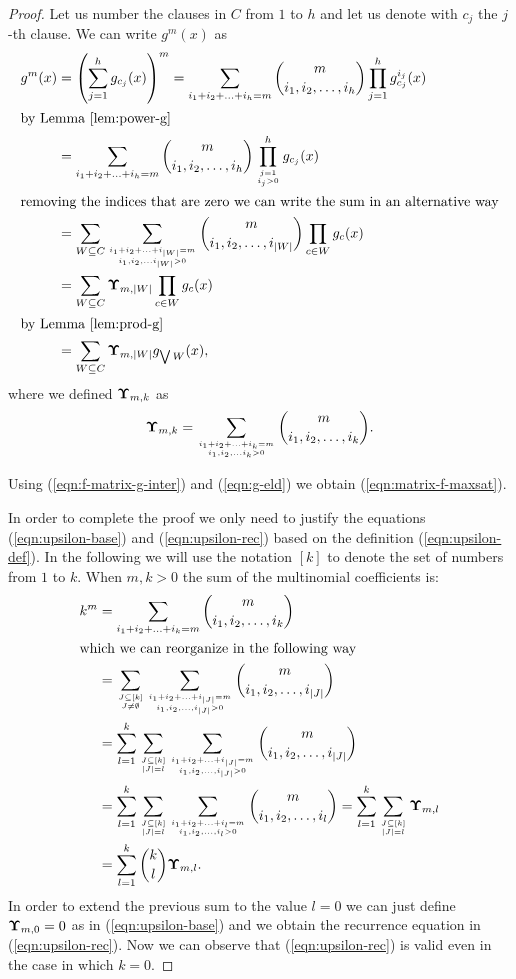 \documentclass{article}
\def\vec#1{\mathchoice{\mbox{\boldmath$\displaystyle#1$}}
  {\mbox{\boldmath$\textstyle#1$}}
  {\mbox{\boldmath$\scriptstyle#1$}}
  {\mbox{\boldmath$\scriptscriptstyle#1$}}}
\newcommand{\comb}[2]{\binom{#1}{#2}}
\begin{document}
\begin{proof}
Let us number the clauses in $C$ from $1$ to $h$ and let us denote with $c_j$ the $j$-th clause. We can write $g^m(x)$ as
\begin{align}
g^m(x) &= \left( \sum_{j=1}^{h} g_{c_j}(x)\right)^m = \sum_{i_1+i_2+\ldots+i_h=m} \comb{m}{i_1, i_2, \ldots, i_h} \prod_{j=1}^{h} g_{c_j}^{i_j}(x) \nonumber \\
\intertext{by Lemma~\ref{lem:power-g}}
&= \sum_{i_1+i_2+\ldots+i_h=m} \comb{m}{i_1, i_2, \ldots, i_h} \prod_{j=1 \atop i_j>0}^{h} g_{c_j}(x) \nonumber \\
\intertext{removing the indices that are zero we can write the sum in an alternative way}
&= \sum_{W \subseteq C} \sum_{i_1+i_2+\ldots+i_{|W|}=m \atop i_1,i_2,\ldots i_{|W|} > 0} \comb{m}{i_1,i_2,\ldots,i_{|W|}} \prod_{c \in W} g_{c}(x) \nonumber \\
&=  \sum_{W \subseteq C} \vec{\Upsilon}_{m,|W|} \prod_{c \in W} g_{c}(x) \nonumber \\
\intertext{by Lemma~\ref{lem:prod-g}}
\label{eqn:f-matrix-g-inter}
&=  \sum_{W \subseteq C} \vec{\Upsilon}_{m,|W|} g_{\bigvee W}(x),
\end{align}
where we defined $\vec{\Upsilon}_{m,k}$ as 
\begin{equation}
\label{eqn:upsilon-def}
\vec{\Upsilon}_{m,k} = \sum_{i_1+i_2+\ldots+i_{k}=m \atop i_1,i_2,\ldots i_{k} > 0} \comb{m}{i_1,i_2,\ldots,i_{k}}.
\end{equation}

Using (\ref{eqn:f-matrix-g-inter}) and (\ref{eqn:g-eld}) we obtain (\ref{eqn:matrix-f-maxsat}).

In order to complete the proof we only need to justify the equations (\ref{eqn:upsilon-base}) and (\ref{eqn:upsilon-rec}) based on the definition (\ref{eqn:upsilon-def}). 
In the following we will use the notation $[k]$ to denote the set of numbers from $1$ to $k$.
When $m,k>0$ the sum of the multinomial coefficients is:
\begin{align}
k^m &= \sum_{i_1+i_2+\ldots+i_k=m} \comb{m}{i_1,i_2,\ldots,i_k} \nonumber \\
\intertext{which we can reorganize in the following way}
&= \sum_{J \subseteq [k] \atop J \neq \emptyset} \sum_{i_1+i_2+\ldots+i_{|J|}=m \atop i_1,i_2,\ldots,i_{|J|}>0} \comb{m}{i_1,i_2,\ldots,i_{|J|}} \nonumber \\
&= \sum_{l=1}^{k} \sum_{J \subseteq [k]\atop |J|=l} \sum_{i_1+i_2+\ldots+i_{|J|}=m \atop i_1,i_2,\ldots,i_{|J|}>0} \comb{m}{i_1,i_2,\ldots,i_{|J|}} \nonumber \\
&= \sum_{l=1}^{k} \sum_{J \subseteq [k]\atop |J|=l} \sum_{i_1+i_2+\ldots+i_l=m \atop i_1,i_2,\ldots,i_l>0} \comb{m}{i_1,i_2,\ldots,i_l}
= \sum_{l=1}^{k} \sum_{J \subseteq [k]\atop |J|=l} \vec{\Upsilon}_{m,l} \nonumber \\
&= \sum_{l=1}^{k} \comb{k}{l} \vec{\Upsilon}_{m,l}  .
\end{align}
In order to extend the previous sum to the value $l=0$ we can just define $\vec{\Upsilon}_{m,0}=0$ as in (\ref{eqn:upsilon-base}) and we obtain the recurrence equation in (\ref{eqn:upsilon-rec}). Now we can observe that (\ref{eqn:upsilon-rec}) is valid even in the case in which $k=0$.
\end{proof}
\end{document}
